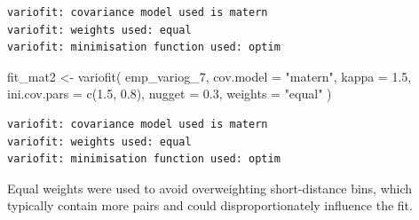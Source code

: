\documentclass[
  11pt,
]{article}
\newenvironment{Shaded}{\begin{snugshade}}{\end{snugshade}}
\newcommand{\AttributeTok}[1]{\textcolor[rgb]{0.40,0.45,0.13}{#1}}
\newcommand{\FloatTok}[1]{\textcolor[rgb]{0.68,0.00,0.00}{#1}}
\newcommand{\FunctionTok}[1]{\textcolor[rgb]{0.28,0.35,0.67}{#1}}
\newcommand{\NormalTok}[1]{\textcolor[rgb]{0.00,0.23,0.31}{#1}}
\newcommand{\OtherTok}[1]{\textcolor[rgb]{0.00,0.23,0.31}{#1}}
\newcommand{\StringTok}[1]{\textcolor[rgb]{0.13,0.47,0.30}{#1}}
\begin{document}
\begin{verbatim}
variofit: covariance model used is matern 
variofit: weights used: equal 
variofit: minimisation function used: optim 
\end{verbatim}

\begin{Shaded}
\begin{Highlighting}[]
\NormalTok{fit\_mat2 }\OtherTok{\textless{}{-}} \FunctionTok{variofit}\NormalTok{(}
\NormalTok{  emp\_variog\_7,}
  \AttributeTok{cov.model =} \StringTok{"matern"}\NormalTok{,}
  \AttributeTok{kappa =} \FloatTok{1.5}\NormalTok{,}
  \AttributeTok{ini.cov.pars =} \FunctionTok{c}\NormalTok{(}\FloatTok{1.5}\NormalTok{, }\FloatTok{0.8}\NormalTok{),}
  \AttributeTok{nugget =} \FloatTok{0.3}\NormalTok{,}
  \AttributeTok{weights =} \StringTok{"equal"}
\NormalTok{)}
\end{Highlighting}
\end{Shaded}

\begin{verbatim}
variofit: covariance model used is matern 
variofit: weights used: equal 
variofit: minimisation function used: optim 
\end{verbatim}

Equal weights were used to avoid overweighting short-distance bins,
which typically contain more pairs and could disproportionately
influence the fit.
\end{document}
